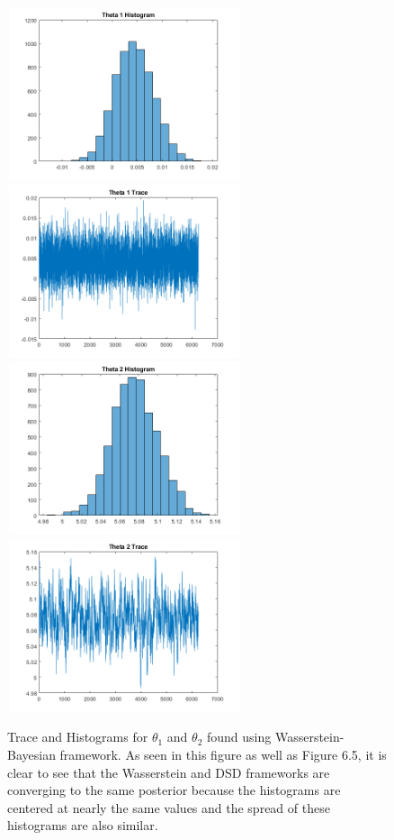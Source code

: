 \documentclass[botnum, fleqn]{unmeethesis}
\begin{document}
\begin{figure}[H]
	\centering
	\includegraphics[width=2.7in,height=2in]{HistTheta1W.png}
	\includegraphics[width=2.7in,height=2in]{TraceTheta1W.png}
	\includegraphics[width=2.7in,height=2in]{HistTheta2W.png}
	\includegraphics[width=2.7in,height=2in]{TraceTheta2W.png}
	\caption{Trace and Histograms for $\theta_1$ and $\theta_2$ found using Wasserstein-Bayesian framework. As seen in this figure as well as Figure 6.5, it is clear to see that the Wasserstein and DSD frameworks are converging to the same posterior because the histograms are centered at nearly the same values and the spread of these histograms are also similar.}
\end{figure}
\end{document}
